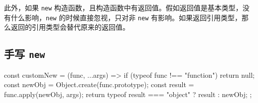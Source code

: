 此外，如果 \texttt{new} 构造函数，且构造函数中有返回值。假如返回值是基本类型，没有什么影响，\texttt{new} 的时候直接忽视，只对非 \texttt{new} 有影响。如果返回引用类型，那么返回的引用类型会替代原来的返回值。

\subsection{手写 \texttt{new}}

\begin{JavaScript}
const customNew = (func, ...args) => {
  if (typeof func !== "function") return null;
  const newObj = Object.create(func.prototype);
  const result = func.apply(newObj, args);
  return typeof result === "object" ? result : newObj;
};
\end{JavaScript}
